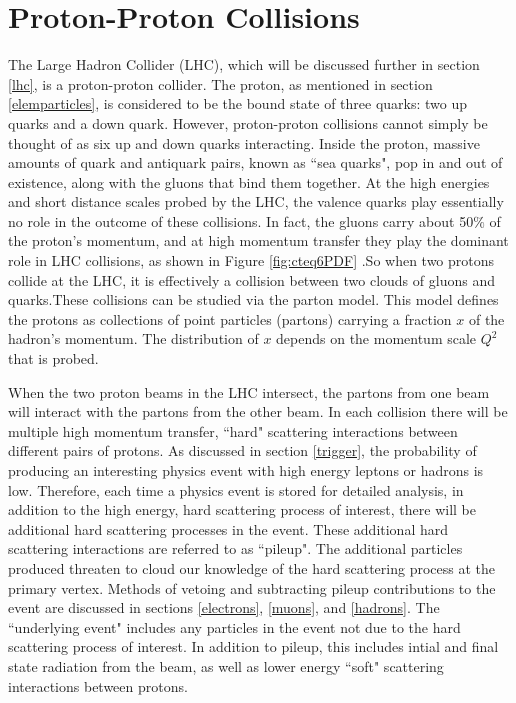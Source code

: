 \documentclass[oneside, letterpaper, oldfontcommands]{memoir}
\begin{document}
\section{Proton-Proton Collisions}\label{ppcoll}
\qquad The Large Hadron Collider (LHC), which will be discussed further in section \ref{lhc}, is a proton-proton collider. The proton, as mentioned in section \ref{elemparticles}, is considered to be the bound state of three quarks: two up quarks and a down quark. However, proton-proton collisions cannot simply be thought of as six up and down quarks interacting. Inside the proton, massive amounts of quark and antiquark pairs, known as ``sea quarks", pop in and out of existence, along with the gluons that bind them together. At the high energies and short distance scales probed by the LHC, the valence quarks play essentially no role in the outcome of these collisions. In fact, the gluons carry about 50$\%$ of the proton's momentum\cite{Halzen:1984mc}, and at high momentum transfer they play the dominant role in LHC collisions, as shown in Figure \ref{fig:cteq6PDF} .So when two protons collide at the LHC, it is effectively a collision between two clouds of gluons and quarks.These collisions can be studied via the parton model. This model defines the protons as collections of point particles (partons) carrying a fraction $x$ of the hadron's momentum. The distribution of $x$ depends on the momentum scale $Q^{2}$ that is probed. 

\qquad When the two proton beams in the LHC intersect, the partons from one beam will interact with the partons from the other beam. In each collision there will be multiple high momentum transfer, ``hard" scattering interactions between different pairs of protons. As discussed in section \ref{trigger}, the probability of producing an interesting physics event with high energy leptons or hadrons is low. Therefore, each time a physics event is stored for detailed analysis, in addition to the high energy, hard scattering process of interest, there will be additional hard scattering processes in the event. These additional hard scattering interactions are referred to as ``pileup". The additional particles produced threaten to cloud our knowledge of the hard scattering process at the primary vertex. Methods of vetoing and subtracting pileup contributions to the event are discussed in sections \ref{electrons}, \ref{muons}, and \ref{hadrons}. The ``underlying event" includes any particles in the event not due to the hard scattering process of interest. In addition to pileup, this includes intial and final state radiation from the beam, as well as lower energy ``soft" scattering interactions between protons. 
\end{document}
